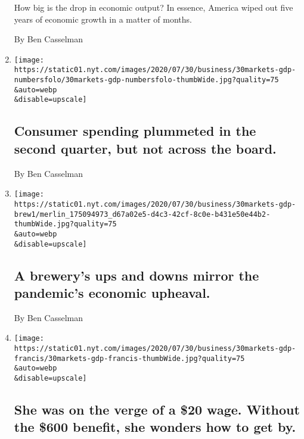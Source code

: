 \begin{enumerate}
  How big is the drop in economic output? In essence, America wiped out
  five years of economic growth in a matter of months.

  By Ben Casselman
\item
  \href{/live/2020/07/30/business/stock-market-today-coronavirus/consumer-spending-plummeted-in-the-second-quarter-but-not-across-the-board}{}

  \texttt{[image: https://static01.nyt.com/images/2020/07/30/business/30markets-gdp-numbersfolo/30markets-gdp-numbersfolo-thumbWide.jpg?quality=75\\\&auto=webp\\\&disable=upscale]}

  \hypertarget{consumer-spending-plummeted-in-the-second-quarter-but-not-across-the-board}{%
  \subsection{Consumer spending plummeted in the second quarter, but not
  across the
  board.}\label{consumer-spending-plummeted-in-the-second-quarter-but-not-across-the-board}}

  By Ben Casselman
\item
  \href{/2020/07/30/business/a-brewerys-ups-and-downs-mirror-the-pandemics-economic-upheaval.html}{}

  \texttt{[image: https://static01.nyt.com/images/2020/07/30/business/30markets-gdp-brew1/merlin\_175094973\_d67a02e5-d4c3-42cf-8c0e-b431e50e44b2-thumbWide.jpg?quality=75\\\&auto=webp\\\&disable=upscale]}

  \hypertarget{a-brewerys-ups-and-downs-mirror-the-pandemics-economic-upheaval}{%
  \subsection{A brewery's ups and downs mirror the pandemic's economic
  upheaval.}\label{a-brewerys-ups-and-downs-mirror-the-pandemics-economic-upheaval}}

  By Ben Casselman
\item
  \href{/2020/07/30/business/she-was-on-the-verge-of-a-20-wage-without-the-600-benefit-she-wonders-how-to-get-by.html}{}

  \texttt{[image: https://static01.nyt.com/images/2020/07/30/business/30markets-gdp-francis/30markets-gdp-francis-thumbWide.jpg?quality=75\\\&auto=webp\\\&disable=upscale]}

  \hypertarget{she-was-on-the-verge-of-a-20-wage-without-the-600-benefit-she-wonders-how-to-get-by}{%
  \subsection{She was on the verge of a \$20 wage. Without the \$600
  benefit, she wonders how to get
  by.}\label{she-was-on-the-verge-of-a-20-wage-without-the-600-benefit-she-wonders-how-to-get-by}}


\end{enumerate}

